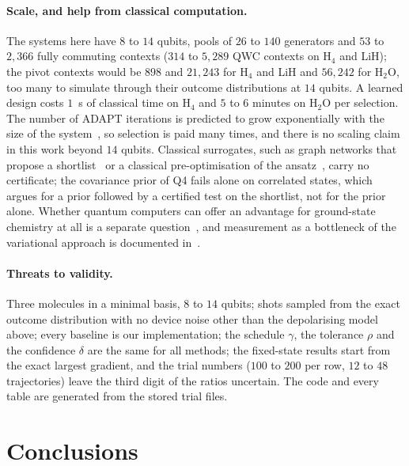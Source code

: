 \documentclass[aps,pra,reprint,superscriptaddress,nofootinbib]{revtex4-2}
\begin{document}
\paragraph{Scale, and help from classical computation.} The systems here have $8$ to $14$ qubits, pools of $26$ to $140$ generators and $53$ to $2{,}366$ fully commuting contexts ($314$ to $5{,}289$ QWC contexts on H$_4$ and LiH); the pivot contexts would be $898$ and $21{,}243$ for H$_4$ and LiH and $56{,}242$ for H$_2$O, too many to simulate through their outcome distributions at $14$ qubits. A learned design costs $1$~s of classical time on H$_4$ and $5$ to $6$ minutes on H$_2$O per selection. The number of ADAPT iterations is predicted to grow exponentially with the size of the system~\cite{hagelueken2026}, so selection is paid many times, and there is no scaling claim in this work beyond $14$ qubits. Classical surrogates, such as graph networks that propose a shortlist~\cite{vahedi2026} or a classical pre-optimisation of the ansatz~\cite{mullinax2024}, carry no certificate; the covariance prior of Q4 fails alone on correlated states, which argues for a prior followed by a certified test on the shortlist, not for the prior alone. Whether quantum computers can offer an advantage for ground-state chemistry at all is a separate question~\cite{lee2023}, and measurement as a bottleneck of the variational approach is documented in~\cite{gonthier2022,patel2025}.

\paragraph{Threats to validity.} Three molecules in a minimal basis, $8$ to $14$ qubits; shots sampled from the exact outcome distribution with no device noise other than the depolarising model above; every baseline is our implementation; the schedule $\gamma$, the tolerance $\rho$ and the confidence $\delta$ are the same for all methods; the fixed-state results start from the exact largest gradient, and the trial numbers ($100$ to $200$ per row, $12$ to $48$ trajectories) leave the third digit of the ratios uncertain. The code and every table are generated from the stored trial files.

\section{Conclusions}
\end{document}
